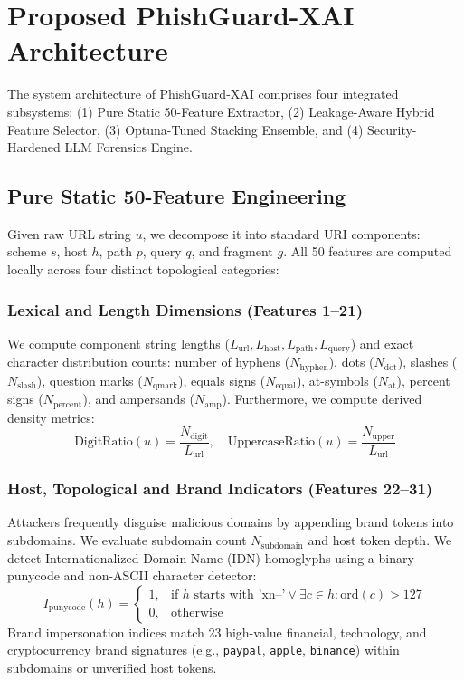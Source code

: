 \documentclass[journal]{IEEEtran}
\begin{document}
\section{Proposed PhishGuard-XAI Architecture}
The system architecture of PhishGuard-XAI comprises four integrated subsystems: (1) Pure Static 50-Feature Extractor, (2) Leakage-Aware Hybrid Feature Selector, (3) Optuna-Tuned Stacking Ensemble, and (4) Security-Hardened LLM Forensics Engine.

\subsection{Pure Static 50-Feature Engineering}
Given raw URL string $u$, we decompose it into standard URI components: scheme $s$, host $h$, path $p$, query $q$, and fragment $g$. All 50 features are computed locally across four distinct topological categories:

\subsubsection{Lexical and Length Dimensions (Features 1--21)}
We compute component string lengths ($L_{\text{url}}, L_{\text{host}}, L_{\text{path}}, L_{\text{query}}$) and exact character distribution counts: number of hyphens ($N_{\text{hyphen}}$), dots ($N_{\text{dot}}$), slashes ($N_{\text{slash}}$), question marks ($N_{\text{qmark}}$), equals signs ($N_{\text{equal}}$), at-symbols ($N_{\text{at}}$), percent signs ($N_{\text{percent}}$), and ampersands ($N_{\text{amp}}$). Furthermore, we compute derived density metrics:
\begin{equation}
\text{DigitRatio}(u) = \frac{N_{\text{digit}}}{L_{\text{url}}}, \quad \text{UppercaseRatio}(u) = \frac{N_{\text{upper}}}{L_{\text{url}}}
\end{equation}

\subsubsection{Host, Topological and Brand Indicators (Features 22--31)}
Attackers frequently disguise malicious domains by appending brand tokens into subdomains. We evaluate subdomain count $N_{\text{subdomain}}$ and host token depth. We detect Internationalized Domain Name (IDN) homoglyphs using a binary punycode and non-ASCII character detector:
\begin{equation}
I_{\text{punycode}}(h) = \begin{cases} 1, & \text{if } h \text{ starts with 'xn--'} \lor \exists c \in h : \text{ord}(c) > 127 \\ 0, & \text{otherwise} \end{cases}
\end{equation}
Brand impersonation indices match 23 high-value financial, technology, and cryptocurrency brand signatures (e.g., \texttt{paypal}, \texttt{apple}, \texttt{binance}) within subdomains or unverified host tokens.
\end{document}
